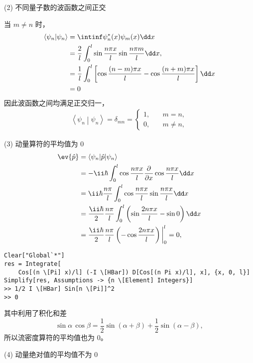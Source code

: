 (2) 不同量子数的波函数之间正交

当 $m \neq n$ 时，
\begin{align}
    \left\langle \psi_n \middle | \psi _n \right\rangle 
    &= \intinf \psi_n^* (x) \psi_m(x) \dd x \\
    &= \frac2l \int_0^l \sin \frac{n\pi x}{l} \sin \frac{n\pi m }{l} \dd x, \\
    &= \frac 1l \int_0^l \left[
        \cos \frac{(n-m)\pi x}l - \cos\frac{(n+m)\pi x}l
    \right] \dd x \\
    &= 0
\end{align}
因此波函数之间均满足正交归一，
\begin{eqnarray}
    \left\langle \psi_n \middle | \psi _n \right\rangle = \delta_{mn} = \begin{cases}
        1, \quad &m=n,\\
        0, \quad &m\neq n,
    \end{cases}
\end{eqnarray}

(3) 动量算符的平均值为 0
\begin{align}
    \ev{\hat p} 
    &= \left\langle \psi_n \middle| \hat p \middle| \psi_n \right\rangle \\
    &= - \ii \hbar \int_0^l \cos\frac{n \pi x}l \frac{\partial}{\partial x} \cos \frac{n\pi x}l \dd x \\
    &= \ii\hbar \frac{n\pi}l \int_0^l \cos \frac{n\pi x}l \sin\frac{n\pi x}l \dd x \\
    &= \frac{\ii\hbar}2 \frac{n\pi}l \int_0^l \left(\sin\frac{2n\pi x}{l} - \sin 0\right)\dd x \\
    &= \frac{\ii\hbar}2 \frac{n\pi}l \left(- \cos \frac{2n\pi x}l\right) \bigg| _0^l = 0,  
\end{align}
\begin{lstlisting}
Clear["Global`*"]
res = Integrate[
    Cos[(n \[Pi] x)/l] (-I \[HBar]) D[Cos[(n Pi x)/l], x], {x, 0, l}]
Simplify[res, Assumptions -> {n \[Element] Integers}]
>> 1/2 I \[HBar] Sin[n \[Pi]]^2
>> 0
\end{lstlisting}
其中利用了积化和差
\begin{equation}
    \sin\alpha \, \cos\beta = \frac12 \sin(\alpha+\beta) + \frac12 \sin(\alpha-\beta),
\end{equation}
所以流密度算符的平均值也为 0。

(4) 动量绝对值的平均值不为 0

